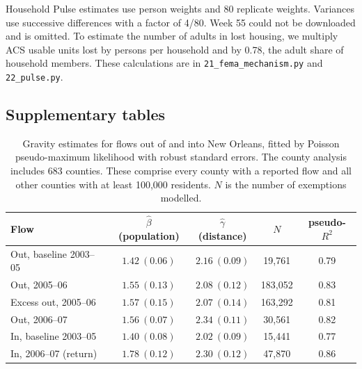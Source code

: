 \documentclass[11pt]{article}
\begin{document}
Household Pulse estimates use person weights and 80 replicate weights. Variances use successive differences with a factor of 4/80. Week 55 could not be downloaded and is omitted. To estimate the number of adults in lost housing, we multiply ACS usable units lost by persons per household and by 0.78, the adult share of household members. These calculations are in \texttt{21\_fema\_mechanism.py} and \texttt{22\_pulse.py}.

\clearpage
\subsection{Supplementary tables}
\begin{table}[h]
\centering\small
\caption{Gravity estimates for flows out of and into New Orleans, fitted by Poisson pseudo-maximum likelihood with robust standard errors. The county analysis includes 683 counties. These comprise every county with a reported flow and all other counties with at least 100{,}000 residents. $N$ is the number of exemptions modelled.}
\label{tab:gravity}
\begin{tabular}{lcccc}
\toprule
Flow & $\hat\beta$ (population) & $\hat\gamma$ (distance) & $N$ & pseudo-$R^2$\\
\midrule
Out, baseline 2003--05 & $1.42\ (0.06)$ & $2.16\ (0.09)$ & 19{,}761 & 0.79\\
Out, 2005--06 & $1.55\ (0.13)$ & $2.08\ (0.12)$ & 183{,}052 & 0.83\\
Excess out, 2005--06 & $1.57\ (0.15)$ & $2.07\ (0.14)$ & 163{,}292 & 0.81\\
Out, 2006--07 & $1.56\ (0.07)$ & $2.34\ (0.11)$ & 30{,}561 & 0.82\\
In, baseline 2003--05 & $1.40\ (0.08)$ & $2.02\ (0.09)$ & 15{,}441 & 0.77\\
In, 2006--07 (return) & $1.78\ (0.12)$ & $2.30\ (0.12)$ & 47{,}870 & 0.86\\
\bottomrule
\end{tabular}
\end{table}
\end{document}
